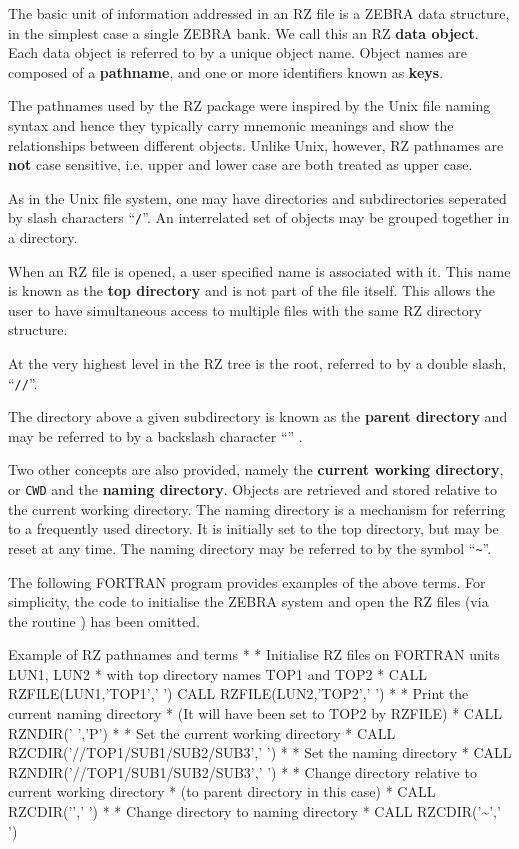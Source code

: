 The basic unit of information addressed in an RZ file
is a ZEBRA data structure, in the simplest case a single ZEBRA bank.
We call this an RZ
{\bf data object}.
Each data object is referred to by a unique object name.
Object names are composed of a
{\bf pathname}, and one or more identifiers known as {\bf keys}.

The pathnames used by the RZ package were inspired by
the Unix file naming syntax and hence they typically 
carry mnemonic meanings and show the relationships
between different objects.
Unlike Unix, however, RZ pathnames are {\bf not} case sensitive, i.e.
upper and lower case are both treated as upper case.

As in the Unix file system, one may have directories and subdirectories
seperated by slash characters ``{\tt/}''.
An interrelated set of objects may be grouped together in a directory.

When an RZ file is opened, a user specified name is associated with it.
This name is known as the {\bf top directory} and is not
part of the file itself. This allows the user to have simultaneous
access to multiple files with the same RZ directory structure.

At the very highest level in the RZ tree is the root, referred
to by a double slash, ``{\tt //}''.

The directory above a given subdirectory is known as the
{\bf parent directory} and may be referred to by a backslash
character ``\bs'' .

Two other concepts are also provided, namely the {\bf current working directory},
or {\tt CWD} and the {\bf naming directory}. Objects are retrieved
and stored relative to the current working directory. The naming directory
is a mechanism for referring to a frequently used directory. 
It is initially set to the top directory, but may be reset at any time.
The naming directory may be referred to by the symbol ``{\tt\~{}}''.

The following FORTRAN program provides examples of the above
terms. For simplicity, the code to initialise the ZEBRA system
and open the RZ files (via the routine ) has
been omitted.

\newpage
\begin{XMPt}{Example of RZ pathnames and terms}
*
*     Initialise RZ files on FORTRAN units LUN1, LUN2
*     with top directory names TOP1 and TOP2
*
      CALL RZFILE(LUN1,'TOP1',' ')
      CALL RZFILE(LUN2,'TOP2',' ')
*
*     Print the current naming directory
*     (It will have been set to TOP2 by RZFILE)
*
      CALL RZNDIR(' ','P')
*
*     Set the current working directory
*
      CALL RZCDIR('//TOP1/SUB1/SUB2/SUB3',' ')
*
*     Set the naming directory
*
      CALL RZNDIR('//TOP1/SUB1/SUB2/SUB3',' ')
*
*     Change directory relative to current working directory
*     (to parent directory in this case)
*
      CALL RZCDIR('\bs ',' ')
*
*     Change directory to naming directory
*
      CALL RZCDIR('\~{}',' ')
\end{XMPt}

